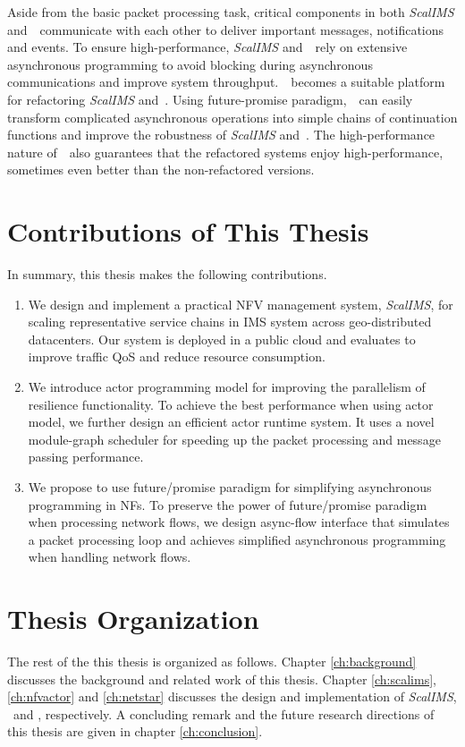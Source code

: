 Aside from the basic packet processing task, critical components in both \textit{ScalIMS} and~\nfactor~communicate with each other to deliver important messages, notifications and events. To ensure high-performance, \textit{ScalIMS} and~\nfactor~rely on extensive asynchronous programming to avoid blocking during asynchronous communications and improve system throughput.~\netstar~becomes a suitable platform for refactoring \textit{ScalIMS} and~\nfactor. Using future-promise paradigm,~\netstar~can easily transform complicated asynchronous operations into simple chains of continuation functions and improve the robustness of \textit{ScalIMS} and~\nfactor. The high-performance nature of~\netstar~also guarantees that the refactored systems enjoy high-performance, sometimes even better than the non-refactored versions.


\section{Contributions of This Thesis}

In summary, this thesis makes the following contributions.

\begin{enumerate}
\item We design and implement a practical NFV management system, \textit{ScalIMS}, for scaling representative service chains in IMS system across geo-distributed datacenters. Our system is deployed in a public cloud and evaluates to improve traffic QoS and reduce resource consumption.
\item We introduce actor programming model for improving the parallelism of resilience functionality. To achieve the best performance when using actor model, we further design an efficient actor runtime system. It uses a novel module-graph scheduler for speeding up the packet processing and message passing performance.
\item We propose to use future/promise paradigm for simplifying asynchronous programming in NFs. To preserve the power of future/promise paradigm when processing network flows, we design async-flow interface that simulates a packet processing loop and achieves simplified asynchronous programming when handling network flows.
\end{enumerate}

\section{Thesis Organization}

The rest of the this thesis is organized as follows. Chapter \ref{ch:background} discusses the background and related work of this thesis. Chapter \ref{ch:scalims}, \ref{ch:nfvactor} and \ref{ch:netstar} discusses the design and implementation of \textit{ScalIMS}, \nfactor~and \netstar, respectively. A concluding remark and the future research directions of this thesis are given in chapter \ref{ch:conclusion}.
